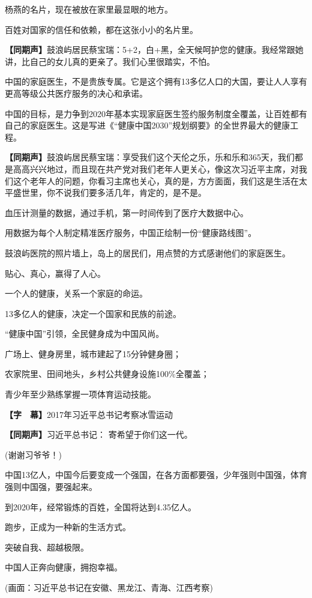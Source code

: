 \documentclass{ctexart}
\newcommand{\zkh}[1]{\textbf{\hspace{-2.7em} 【#1】}}
\begin{document}
 杨燕的名片，现在被放在家里最显眼的地方。

 百姓对国家的信任和依赖，都在这张小小的名片里。

 \zkh{同期声}鼓浪屿居民蔡宝瑞：5+2，白+黑，全天候呵护您的健康。我经常跟她讲，比自己的女儿真的更亲了。我们心里很踏实，不怕。

 
中国的家庭医生，不是贵族专属。它是这个拥有13多亿人口的大国，要让人人享有更高等级公共医疗服务的决心和承诺。

中国的目标，是力争到2020年基本实现家庭医生签约服务制度全覆盖，让百姓都有自己的家庭医生。这是写进《``健康中国2030''规划纲要》的全世界最大的健康工程。

 \zkh{同期声}鼓浪屿居民蔡宝瑞：享受我们这个天伦之乐，乐和乐和365天，我们都是高高兴兴地过，而且现在共产党对我们老年人更关心，像这次习近平主席，对我们这个老年人的问题，你看习主席也关心，真的是，方方面面，我们这是生活在太平盛世里，你不说我们要多活几年，肯定的，是不是。

 血压计测量的数据，通过手机，第一时间传到了医疗大数据中心。

 用数据为每个人制定精准医疗服务，中国正绘制一份``健康路线图''。

 鼓浪屿医院的照片墙上，岛上的居民们，用点赞的方式感谢他们的家庭医生。

 贴心、真心，赢得了人心。

 一个人的健康，关系一个家庭的命运。

 13多亿人的健康，决定一个国家和民族的前途。

 ``健康中国''引领，全民健身成为中国风尚。

 广场上、健身房里，城市建起了15分钟健身圈；

 农家院里、田间地头，乡村公共健身设施100{\%}全覆盖；

 青少年至少熟练掌握一项体育运动技能。

 \zkh{字　幕}2017年习近平总书记考察冰雪运动

 \zkh{同期声}习近平总书记： 寄希望于你们这一代。

 (谢谢习爷爷！)

中国13亿人，中国今后要变成一个强国，在各方面都要强，少年强则中国强，体育强则中国强，要强起来。

 到2020年，经常锻炼的百姓，全国将达到4.35亿人。

 跑步，正成为一种新的生活方式。

 突破自我、超越极限。

 中国人正奔向健康，拥抱幸福。

 (画面：习近平总书记在安徽、黑龙江、青海、江西考察)
\end{document}

